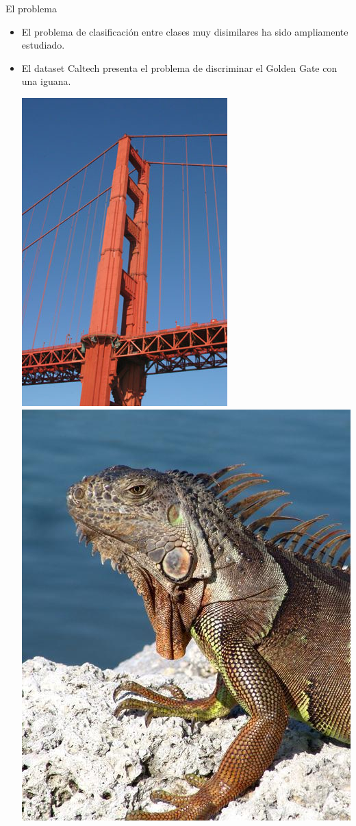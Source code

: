 \documentclass{beamer}
\begin{document}
\begin{frame}{El problema}
    \begin{itemize}
        \item El problema de clasificación entre clases muy disimilares ha
            sido ampliamente estudiado.
            \pause
        \item El dataset Caltech presenta el problema de discriminar el
            Golden Gate con una iguana.
            \begin{center}
                {\includegraphics[scale=0.2]{imagen/ggate.jpg}}
                {\includegraphics[scale=0.14]{imagen/iguana.jpg}}

\end{center}
\end{itemize}
\end{frame}
\end{document}
